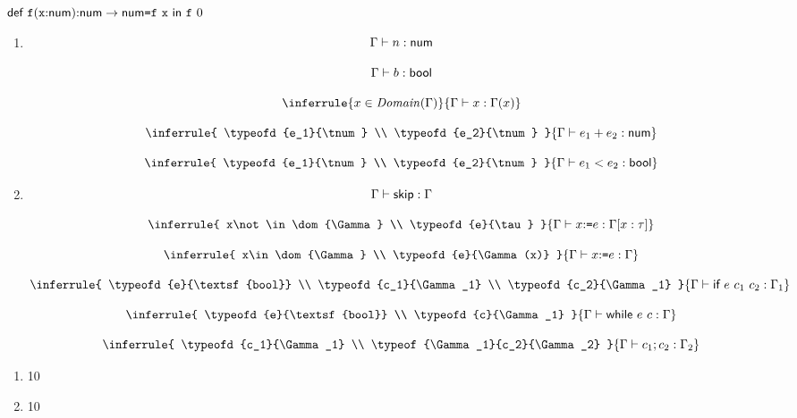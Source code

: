 \textbf{}

$\textsf{def}\ \texttt{f}(\texttt{x}{:}\textsf{num}){:}\textsf{num}\rightarrow\textsf{num}\texttt{=}\texttt{f}\ \texttt{x}\ \textsf{in}\ \texttt{f}\ 0$
\\

\textbf{}
\begin{enumerate}
  \item
    \[
      \Gamma\vdash n:\textsf{num}
    \]

    \[
      \Gamma\vdash b:\textsf{bool}
    \]

    \[
      \inferrule
      { x\in\dom{\Gamma} }
      { \typeofd{x}{\Gamma(x)} }
    \]

    \[
      \inferrule
      { \typeofd{e_1}{\tnum} \\ \typeofd{e_2}{\tnum} }
      { \typeofd{e_1+e_2}{\tnum} }
    \]

    \[
      \inferrule
      { \typeofd{e_1}{\tnum} \\ \typeofd{e_2}{\tnum} }
      { \typeofd{e_1<e_2}{\textsf{bool}} }
    \]
  \item
    \[
      \Gamma\vdash\textsf{skip}:\Gamma
    \]

    \[
      \inferrule
      { x\not\in\dom{\Gamma} \\ \typeofd{e}{\tau} }
      { \typeofd{\eset{x}{e}}{\Gamma[x:\tau]} }
    \]

    \[
      \inferrule
      { x\in\dom{\Gamma} \\ \typeofd{e}{\Gamma(x)} }
      { \typeofd{\eset{x}{e}}{\Gamma} }
    \]

    \[
      \inferrule
      { \typeofd{e}{\textsf{bool}} \\
        \typeofd{c_1}{\Gamma_1} \\
        \typeofd{c_2}{\Gamma_1} }
      { \typeofd{\eif{e}{c_1}{c_2}}{\Gamma_1} }
    \]

    \[
      \inferrule
      { \typeofd{e}{\textsf{bool}} \\ \typeofd{c}{\Gamma_1} }
      { \typeofd{\textsf{while}\ e\ c}{\Gamma} }
    \]

    \[
      \inferrule
      { \typeofd{c_1}{\Gamma_1} \\ \typeof{\Gamma_1}{c_2}{\Gamma_2} }
      { \typeofd{\eseq{c_1}{c_2}}{\Gamma_2} }
    \]
\end{enumerate}

\textbf{}
\begin{enumerate}
  \item 10
  \item 10
\end{enumerate}


